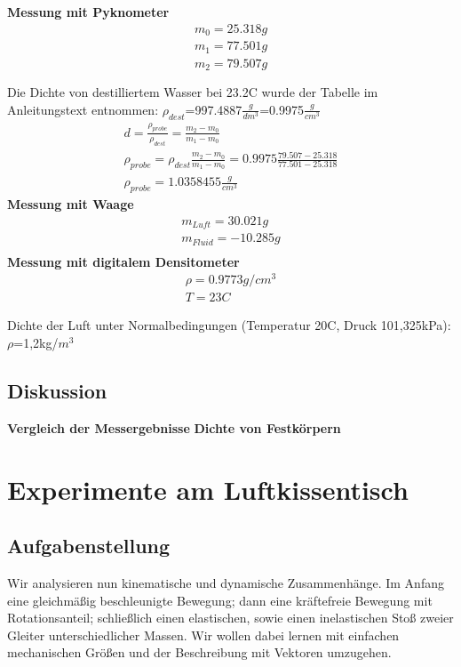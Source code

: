 \documentclass{article}
\begin{document}
\textbf{Messung mit Pyknometer}
\begin{gather*}
m_0=25.318g\\ %
m_1=77.501g\\ %
m_2=79.507g\\ %
\\
\end{gather*}
Die Dichte von destilliertem Wasser bei 23.2C wurde der Tabelle im Anleitungstext entnommen: $\rho_{dest}$=997.4887$\frac{g}{dm^3}$=0.9975$\frac{g}{cm^3}$
\begin{gather*}
d=\frac{\rho_{probe}}{\rho_{dest}}=\frac{m_2 - m_0}{m_1 - m_0}\\
\rho_{probe}=\rho_{dest}\frac{m_2 - m_0}{m_1 - m_0}=0.9975\frac{79.507 - 25.318}{77.501 - 25.318} \\
\rho_{probe}=1.0358455\frac{g}{cm^3}
\end{gather*}
\textbf{Messung mit Waage}
\begin{gather*}
m_{Luft}=30.021g\\ %
m_{Fluid}=-10.285g\\ %
\end{gather*}
\textbf{Messung mit digitalem Densitometer}
\begin{gather*}
\rho=0.9773g/cm^3 \\
T=23C
\end{gather*}

Dichte der Luft unter Normalbedingungen (Temperatur 20C, Druck 101,325kPa): $\rho$=1,2kg/$m^3$


\subsection{Diskussion}
\textbf{Vergleich der Messergebnisse}
\textbf{Dichte von Festkörpern}

\newpage
\section{Experimente am Luftkissentisch}

\subsection{Aufgabenstellung}
Wir analysieren nun kinematische und dynamische Zusammenhänge. 
Im Anfang eine gleichmäßig beschleunigte Bewegung; dann eine kräftefreie Bewegung mit Rotationsanteil; schließlich einen elastischen, sowie einen inelastischen Stoß zweier Gleiter unterschiedlicher Massen. Wir wollen dabei lernen mit einfachen mechanischen Größen und der Beschreibung mit Vektoren umzugehen. 
\end{document}
